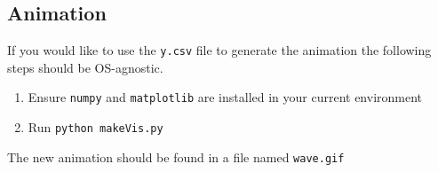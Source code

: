 \documentclass[9pt,technote]{IEEEtran}
\begin{document}
\subsection{Animation}

If you would like to use the \texttt{y.csv} file to generate the animation the following steps should be OS-agnostic.

\begin{enumerate}
    \item Ensure \texttt{numpy} and \texttt{matplotlib} are installed in your current environment
    \item Run \texttt{python makeVis.py}
\end{enumerate}

The new animation should be found in a file named \texttt{wave.gif}
\end{document}
